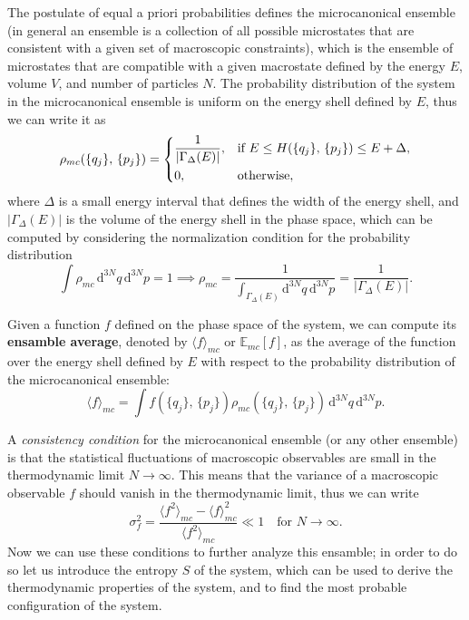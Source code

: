 The postulate of equal a priori probabilities defines the microcanonical ensemble (in general an ensemble is a collection of all possible microstates that are consistent with a given set of macroscopic constraints), which is the ensemble of microstates that are compatible with a given macrostate defined by the energy \(E\), volume \(V\), and number of particles \(N\). The probability distribution of the system in the microcanonical ensemble is uniform on the energy shell defined by \(E\), thus we can write it as
\begin{equation}
    \rho_{mc}(\{q_j\},\,\{p_j\}) = \begin{dcases}
        \frac{1}{|\Gamma_{\Delta}(E)|}, & \text{if } E \leq H(\{q_j\},\,\{p_j\}) \leq E + \Delta, \\
        0,                              & \text{otherwise},
    \end{dcases}
    \label{eq:microcanonical_distribution}
\end{equation}
where \(\Delta\) is a small energy interval that defines the width of the energy shell, and \(|\Gamma_{\Delta}(E)|\) is the volume of the energy shell in the phase space, which can be computed by considering the normalization condition for the probability distribution
\[
    \int \rho_{mc} \, \mathrm{d}^{3N}q \, \mathrm{d}^{3N}p = 1 \implies \rho_{mc} = \frac{1}{\int_{\Gamma_{\Delta}(E)} \mathrm{d}^{3N}q \, \mathrm{d}^{3N}p} = \frac{1}{|\Gamma_{\Delta}(E)|}.
\]

Given a function \(f\) defined on the phase space of the system, we can compute its \textbf{ensamble average}, denoted by \(\langle f \rangle_{mc}\) or \(\mathbb{E}_{mc}\left[ f \right]\), as the average of the function over the energy shell defined by \(E\) with respect to the probability distribution of the microcanonical ensemble:
\begin{equation}
    \langle f \rangle_{mc} = \int f(\{q_j\},\,\{p_j\}) \rho_{mc}(\{q_j\},\,\{p_j\}) \, \mathrm{d}^{3N}q \, \mathrm{d}^{3N}p.
    \label{eq:microcanonical_ensemble_average}
\end{equation}

A \textit{consistency condition} for the microcanonical ensemble (or any other ensemble) is that the statistical fluctuations of macroscopic observables are small in the thermodynamic limit \(N \to \infty\). This means that the variance of a macroscopic observable \(f\) should vanish in the thermodynamic limit, thus we can write
\[
    \sigma_f^2 = \frac{\langle f^2 \rangle_{mc} - \langle f \rangle_{mc}^2}{\langle f^2 \rangle_{mc}} \ll 1 \quad \text{for } N \to \infty.
\]
Now we can use these conditions to further analyze this ensamble; in order to do so let us introduce the entropy \(S\) of the system, which can be used to derive the thermodynamic properties of the system, and to find the most probable configuration of the system.

